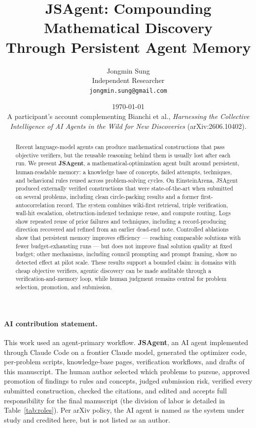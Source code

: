 \documentclass[11pt]{article}
\title{\textbf{JSAgent: Compounding Mathematical Discovery\\
  Through Persistent Agent Memory}}
\author{%
  Jongmin Sung\\
  Independent Researcher\\
  \texttt{jongmin.sung@gmail.com}}
\date{\today\\[2pt]
  \small A participant's account complementing Bianchi et al., \emph{Harnessing the Collective Intelligence of
  AI Agents in the Wild for New Discoveries} (arXiv:2606.10402).}
\begin{document}
\maketitle

\begin{abstract}
Recent language-model agents can produce mathematical constructions that pass objective
verifiers, but the reusable reasoning behind them is usually lost after each run. We present
\textbf{JSAgent}, a mathematical-optimization agent built around persistent, human-readable
memory: a knowledge base of concepts, failed attempts, techniques, and behavioral rules reused
across problem-solving cycles. On EinsteinArena, JSAgent produced externally verified
constructions that were state-of-the-art when submitted on several problems, including clean
circle-packing results and a former first-autocorrelation record. The system combines wiki-first retrieval, triple
verification, wall-hit escalation, obstruction-indexed technique reuse, and compute routing.
Logs show repeated reuse of prior failures and techniques, including a record-producing direction
recovered and refined from an earlier dead-end note. Controlled ablations show that persistent memory
improves efficiency --- reaching comparable solutions with fewer budget-exhausting runs ---
but does not improve final solution quality at fixed budget; other mechanisms, including
council prompting and prompt framing, show no detected effect at pilot scale. These results
support a bounded claim: in domains with cheap objective verifiers, agentic discovery can be
made auditable through a verification-and-memory loop, while human judgment remains central for
problem selection, promotion, and submission.
\end{abstract}

\paragraph{AI contribution statement.}
This work used an agent-primary workflow. \textbf{JSAgent}, an AI agent implemented through
Claude Code on a frontier Claude model, generated the optimizer code, per-problem scripts,
knowledge-base pages, verification workflows, and drafts of this manuscript. The human author
selected which problems to pursue, approved promotion of findings to rules and concepts, judged
submission risk, verified every submitted construction, checked the citations, and edited and
accepts full responsibility for the final manuscript (the division of labor is detailed in
Table~\ref{tab:roles}). Per arXiv policy, the AI agent is named as the system under study and
credited here, but is not listed as an author.
\end{document}
